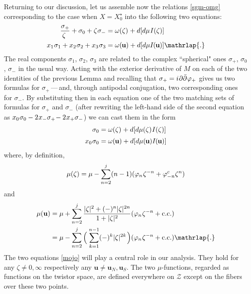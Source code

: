 \documentclass[11pt]{amsart}
\theoremstyle{remark}
\theoremstyle{remark}
\theoremstyle{definition}
\theoremstyle{definition}
\theoremstyle{definition}
\newcommand{\IU}{I\nhp(\nhp\mathbf{u}\hspace{-0.2pt})} %
\newcommand{\0}{{\scriptstyle 0'}} %
\newcommand{\1}{{\scriptstyle 1'}}
\newcommand{\pt}{\hspace{1pt}} %
\newcommand{\hp}{\hspace{0.5pt}} %
\newcommand{\nhp}{\hspace{-0.5pt}} %
\begin{document}
Returning to our discussion, let us assemble now the relations \eqref{sgm-omg} corresponding to the case when $X = X^{\star}_0$ into the following two equations:
\begin{equation}
\begin{aligned}
\frac{\sigma_+}{\zeta\ } + \sigma_0 + \zeta \hp \sigma_- & = \omega(\zeta) \hp + d[d\mu \hp I(\zeta)] \\
x_1\hp\sigma_1 + x_2 \hp\sigma_2 + x_3 \hp\sigma_3 & = \omega(\nhp\mathbf{u}) + d[d\mu \IU] \mathrlap{.}
\end{aligned}
\end{equation} 
The real components $\sigma_1$, $\sigma_2$, $\sigma_3$ are related to the complex ``spherical" ones $\sigma_+$, $\sigma_0$, $\sigma_-$ in the usual way. Acting with the exterior derivative of $M$ on each of the two identities of the previous Lemma and recalling that $\sigma_+ = i \hp \partial\bar{\partial}\hp \varphi_+$ gives us two formulas for $\sigma_+$\,---\,and, through antipodal conjugation, two corresponding ones for $\sigma_-$. By substituting then in each equation one of the two matching sets of formulas for $\sigma_+$ and $\sigma_-$ (after rewriting the left-hand side of the second equation as $x_0 \hp \sigma_0 - 2 \hp x_- \sigma_+ \!- 2 \hp x_+\sigma_-$) we can cast them in the form
\begin{equation} \label{mojo}
\begin{aligned}
\sigma_0 & = \omega(\zeta) \hp + d[d\mu(\zeta) \hp I(\zeta)]   \\[2pt]
x_0 \hp \sigma_0 & = \omega(\nhp\mathbf{u}) + d[d\mu(\hspace{-0.6pt}\mathbf{u} \hspace{-0.2pt}) \IU] 
\end{aligned}
\end{equation}
where, by definition,
\begin{equation} \label{mu-zeta}
\mu(\zeta) = \mu - \sum_{n=2}^j (n-1) ( \varphi_{n} \hp \zeta^{-n} + \varphi^c_{-n} \zeta^n )
\end{equation}
and
{\allowdisplaybreaks
\begin{align}
\mu(\mathbf{u}) & = \mu + \sum_{n=2}^j \frac{|\zeta|^2 + (-)^n|\zeta|^{2n}}{1+|\zeta|^2} ( \varphi_{n} \hp \zeta^{-n} + \text{c.c.}) \\
& = \mu - \sum_{n=2}^j \Big(\pt \sum_{k=1}^{n-1} (-)^k |\zeta|^{2k} \pt\Big) ( \varphi_{n} \hp \zeta^{-n} + \text{c.c.}) \mathrlap{.} \nonumber
\end{align}
}%
The two equations \eqref{mojo} will play a central role in our analysis. They hold for any $\zeta \neq 0, \infty$ respectively any $\mathbf{u} \neq \mathbf{u}_N, \mathbf{u}_S$. The two \mbox{$\mu$\pt-\hp functions}, regarded as functions on the twistor space, are defined everywhere on $\mathcal{Z}$ except on the fibers over these two points.  
\end{document}
